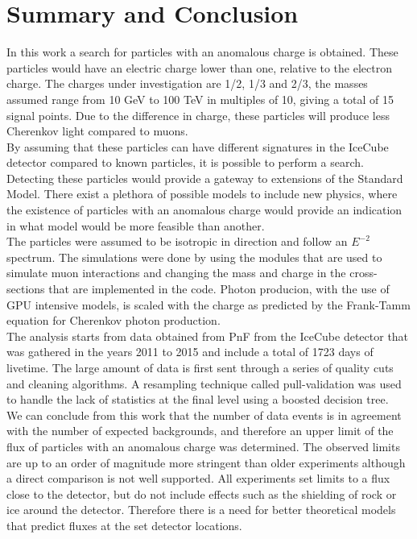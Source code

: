 \chapter{Summary and Conclusion}
\label{ch:summary}
In this work a search for particles with an anomalous charge is obtained. These particles would have an electric charge lower than one, relative to the electron charge. The charges under investigation are 1/2, 1/3 and 2/3, the masses assumed range from 10 GeV to 100 TeV in multiples of 10, giving a total of 15 signal points. Due to the difference in charge, these particles will produce less Cherenkov light compared to muons.\\

\noindent By assuming that these particles can have different signatures in the IceCube detector compared to known particles, it is possible to perform a search. Detecting these particles would provide a gateway to extensions of the Standard Model. There exist a plethora of possible models to include new physics, where the existence of particles with an anomalous charge would provide an indication in what model would be more feasible than another.\\

\noindent The particles were assumed to be isotropic in direction and follow an $E^{-2}$ spectrum. The simulations were done by using the modules that are used to simulate muon interactions and changing the mass and charge in the cross-sections that are implemented in the code. Photon producion, with the use of GPU intensive models, is scaled with the charge as predicted by the Frank-Tamm equation for Cherenkov photon production.\\

\noindent The analysis starts from data obtained from PnF from the IceCube detector that was gathered in the years 2011 to 2015 and include a total of 1723 days of livetime. The large amount of data is first sent through a series of quality cuts and cleaning algorithms. A resampling technique called pull-validation was used to handle the lack of statistics at the final level using a boosted decision tree.\\

\noindent We can conclude from this work that the number of data events is in agreement with the number of expected backgrounds, and therefore an upper limit of the flux of particles with an anomalous charge was determined. The observed limits are up to an order of magnitude more stringent than older experiments although a direct comparison is not well supported. All experiments set limits to a flux close to the detector, but do not include effects such as the shielding of rock or ice around the detector. Therefore there is a need for better theoretical models that predict fluxes at the set detector locations.\\

